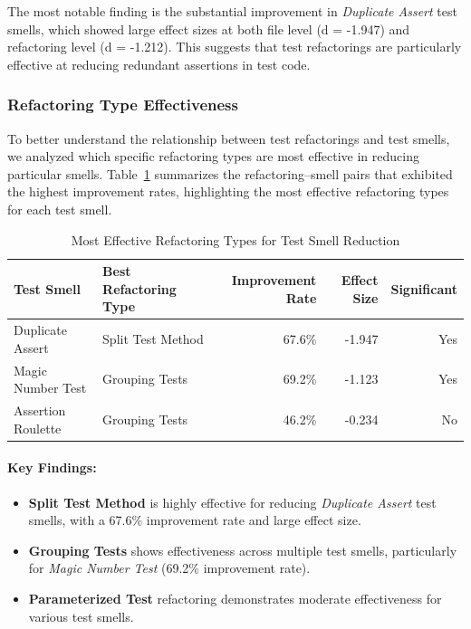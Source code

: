 


The most notable finding is the substantial improvement in \textit{Duplicate Assert} test smells, which showed large effect sizes at both file level (d = -1.947) and refactoring level (d = -1.212). This suggests that test refactorings are particularly effective at reducing redundant assertions in test code.

\subsubsection{Refactoring Type Effectiveness}

To better understand the relationship between test refactorings and test smells, we analyzed which specific refactoring types are most effective in reducing particular smells. Table~\ref{tab:refactoring-effectiveness} summarizes the refactoring–smell pairs that exhibited the highest improvement rates, highlighting the most effective refactoring types for each test smell.

\begin{table}[htbp]
\centering
\caption{Most Effective Refactoring Types for Test Smell Reduction}
\label{tab:refactoring-effectiveness}
\begin{tabular}{llrrr}
\toprule
\textbf{Test Smell} & \textbf{Best Refactoring Type} & \textbf{Improvement Rate} & \textbf{Effect Size} & \textbf{Significant} \\
\midrule
Duplicate Assert & Split Test Method & 67.6\% & -1.947 & Yes \\
Magic Number Test & Grouping Tests & 69.2\% & -1.123 & Yes \\
Assertion Roulette & Grouping Tests & 46.2\% & -0.234 & No \\
\bottomrule
\end{tabular}
\end{table}

\paragraph{Key Findings:}
\begin{itemize}
    \item \textbf{Split Test Method} is highly effective for reducing \textit{Duplicate Assert} test smells, with a 67.6\% improvement rate and large effect size.
    \item \textbf{Grouping Tests} shows effectiveness across multiple test smells, particularly for \textit{Magic Number Test} (69.2\% improvement rate).
    \item \textbf{Parameterized Test} refactoring demonstrates moderate effectiveness for various test smells.
\end{itemize}

